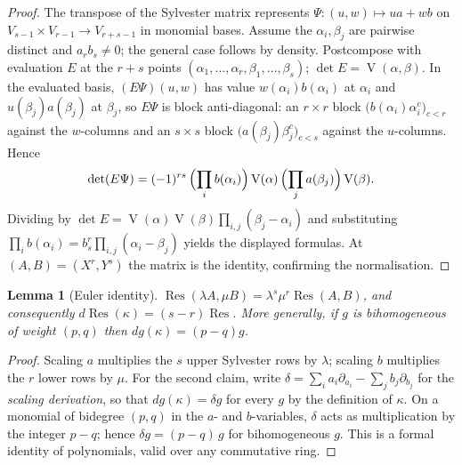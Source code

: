 \documentclass[11pt,reqno]{amsart}
\newtheorem{lemma}[lemma]{Lemma}
\theoremstyle{definition}
\theoremstyle{remark}
\newcommand{\Res}{\operatorname{Res}}
\newcommand{\Vand}{\operatorname{V}}
\begin{document}
\begin{proof}
The transpose of the Sylvester matrix represents
$\Psi:(u,w)\mapsto ua+wb$ on
$V_{s-1}\times V_{r-1}\to V_{r+s-1}$ in monomial bases.  Assume the
$\alpha_i,\beta_j$ are pairwise distinct and $a_rb_s\ne0$; the general
case follows by density.  Postcompose with evaluation $E$ at the
$r+s$ points $(\alpha_1,\dots,\alpha_r,\beta_1,\dots,\beta_s)$;
$\det E=\Vand(\alpha,\beta)$.  In the evaluated basis,
$(E\Psi)(u,w)$ has value $w(\alpha_i)b(\alpha_i)$ at $\alpha_i$ and
$u(\beta_j)a(\beta_j)$ at $\beta_j$, so $E\Psi$ is block
anti-diagonal: an $r\times r$ block
$\bigl(b(\alpha_i)\alpha_i^{c}\bigr)_{c<r}$ against the $w$-columns and
an $s\times s$ block
$\bigl(a(\beta_j)\beta_j^{c}\bigr)_{c<s}$ against the $u$-columns.
Hence
\[
 \det(E\Psi)=(-1)^{rs}\,
 \Bigl(\prod_ib(\alpha_i)\Bigr)\Vand(\alpha)\,
 \Bigl(\prod_ja(\beta_j)\Bigr)\Vand(\beta).
\]
Dividing by
$\det E=\Vand(\alpha)\Vand(\beta)\prod_{i,j}(\beta_j-\alpha_i)$
and substituting
$\prod_ib(\alpha_i)=b_s^r\prod_{i,j}(\alpha_i-\beta_j)$
yields the displayed formulas.  At $(A,B)=(X^r,Y^s)$ the matrix is the
identity, confirming the normalisation.
\end{proof}

\begin{lemma}[Euler identity]\label{lem:euler}
$\Res(\lambda A,\mu B)=\lambda^s\mu^r\Res(A,B)$, and consequently
$d\Res(\kappa)=(s-r)\Res$.  More generally, if $g$ is bihomogeneous of
weight $(p,q)$ then $dg(\kappa)=(p-q)g$.
\end{lemma}

\begin{proof}
Scaling $a$ multiplies the $s$ upper Sylvester rows by $\lambda$;
scaling $b$ multiplies the $r$ lower rows by $\mu$.  For the second
claim, write
$\delta=\sum_ia_i\partial_{a_i}-\sum_jb_j\partial_{b_j}$ for the
\emph{scaling derivation}, so that $dg(\kappa)=\delta g$ for every
$g$ by the definition of $\kappa$.  On a monomial of bidegree
$(p,q)$ in the $a$- and $b$-variables, $\delta$ acts as
multiplication by the integer $p-q$; hence
$\delta g=(p-q)\,g$ for bihomogeneous $g$.  This is a formal
identity of polynomials, valid over any commutative ring.
\end{proof}
\end{document}
